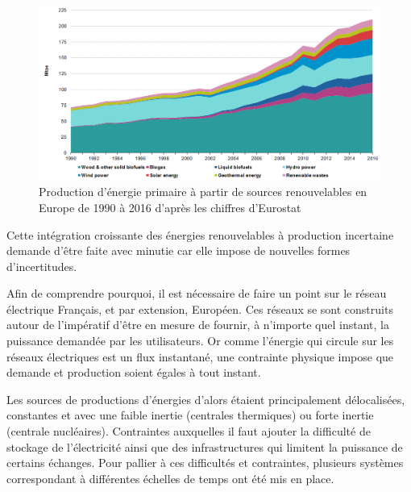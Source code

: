 \documentclass[12pt]{report}
\begin{document}
\begin{figure}[h]
	\begin{center}
		\includegraphics[width = \linewidth]{Images/Intro/Primary_production_of_energy_1990-2016.png}
		\caption{Production d'énergie primaire à partir de sources renouvelables en Europe de 1990 à 2016 d'après les chiffres d'Eurostat}
		\label{fig:Intro_EnergyProduction}
	\end{center}
\end{figure}

Cette intégration croissante des énergies renouvelables à production incertaine demande d'être faite avec minutie car elle impose de nouvelles formes d'incertitudes. %

Afin de comprendre pourquoi, il est nécessaire de faire un point sur le réseau électrique Français, et par extension, Européen. Ces réseaux se sont construits autour de l'impératif d'être en mesure de fournir, à n'importe quel instant, la puissance demandée par les utilisateurs. Or comme l'énergie qui circule sur les réseaux électriques est un flux instantané, une contrainte physique impose que demande et production soient égales à tout instant.

Les sources de productions d'énergies d'alors étaient principalement délocalisées, constantes et avec une faible inertie (centrales thermiques) ou forte inertie (centrale nucléaires).  Contraintes auxquelles il faut ajouter la difficulté de stockage de l'électricité ainsi que des infrastructures qui limitent la puissance de certains échanges. Pour pallier à ces difficultés et contraintes, plusieurs systèmes correspondant à différentes échelles de temps ont été mis en place.

\end{document}
